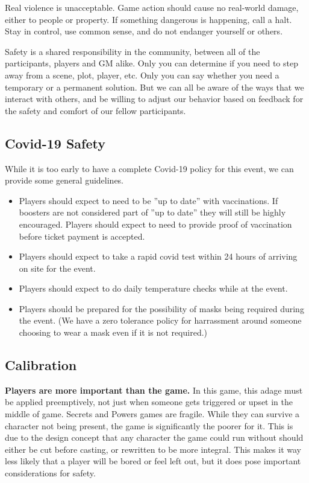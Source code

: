 \documentclass[sheet]{GL2020}
\begin{document}
Real violence is unacceptable. Game action should cause no real-world damage, either to people or property. If something dangerous is happening, call a halt. Stay in control, use common sense, and do not endanger yourself or others.

Safety is a shared responsibility in the community, between all of the participants, players and GM alike. Only you can determine if you need to step away from a scene, plot, player, etc. Only you can say whether you need a temporary or a permanent solution. But we can all be aware of the ways that we interact with others, and be willing to adjust our behavior based on feedback for the safety and comfort of our fellow participants.

\subsection{Covid-19 Safety}
While it is too early to have a complete Covid-19 policy for this event, we can provide some general guidelines. 
\begin{itemize}
\item Players should expect to need to be ''up to date'' with vaccinations. If boosters are not considered part of ''up to date'' they will still be highly encouraged. Players should expect to need to provide proof of vaccination before ticket payment is accepted.
\item Players should expect to take a rapid covid test within 24 hours of arriving on site for the event.
\item Players should expect to do daily temperature checks while at the event.
\item Players should be prepared for the possibility of masks being required during the event. (We have a zero tolerance policy for harrassment around someone choosing to wear a mask even if it is not required.)
\end{itemize}

\subsection{Calibration}
\textbf{Players are more important than the game.} In this game, this adage must be applied preemptively, not just when someone gets triggered or upset in the middle of game. Secrets and Powers games are fragile. While they can survive a character not being present, the game is significantly the poorer for it. This is due to the design concept that any character the game could run without should either be cut before casting, or rewritten to be more integral. This makes it way less likely that a player will be bored or feel left out, but it does pose important considerations for safety.
\end{document}
